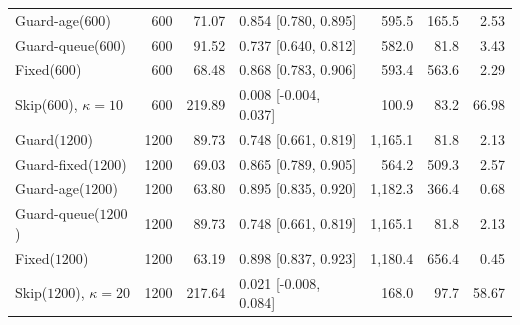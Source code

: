 \documentclass[mathematics,supfile,submit,moreauthors]{Definitions/mdpi}
\newcommand{\devnum}[1]{#1}
\begin{document}
\begin{table}[H]
\begin{tabular}{lrrlrrr}
Guard-age($\devnum{600}$)    & \devnum{600} & \devnum{71.07} & \devnum{0.854 [0.780, 0.895]} & \devnum{595.5} & \devnum{165.5} & \devnum{2.53} \\
Guard-queue($\devnum{600}$)  & \devnum{600} & \devnum{91.52} & \devnum{0.737 [0.640, 0.812]} & \devnum{582.0} & \devnum{81.8} & \devnum{3.43} \\
Fixed($\devnum{600}$)        & \devnum{600} & \devnum{68.48} & \devnum{0.868 [0.783, 0.906]} & \devnum{593.4} & \devnum{563.6} & \devnum{2.29} \\
Skip($\devnum{600}$), $\kappa=10$ & \devnum{600} & \devnum{219.89} & \devnum{0.008 [-0.004, 0.037]} & \devnum{100.9} & \devnum{83.2} & \devnum{66.98} \\
Guard($\devnum{1200}$)       & \devnum{1200} & \devnum{89.73} & \devnum{0.748 [0.661, 0.819]} & \devnum{1{,}165.1} & \devnum{81.8} & \devnum{2.13} \\
Guard-fixed($\devnum{1200}$) & \devnum{1200} & \devnum{69.03} & \devnum{0.865 [0.789, 0.905]} & \devnum{564.2} & \devnum{509.3} & \devnum{2.57} \\
Guard-age($\devnum{1200}$)   & \devnum{1200} & \devnum{63.80} & \devnum{0.895 [0.835, 0.920]} & \devnum{1{,}182.3} & \devnum{366.4} & \devnum{0.68} \\
Guard-queue($\devnum{1200}$) & \devnum{1200} & \devnum{89.73} & \devnum{0.748 [0.661, 0.819]} & \devnum{1{,}165.1} & \devnum{81.8} & \devnum{2.13} \\
Fixed($\devnum{1200}$)       & \devnum{1200} & \devnum{63.19} & \devnum{0.898 [0.837, 0.923]} & \devnum{1{,}180.4} & \devnum{656.4} & \devnum{0.45} \\
Skip($\devnum{1200}$), $\kappa=20$ & \devnum{1200} & \devnum{217.64} & \devnum{0.021 [-0.008, 0.084]} & \devnum{168.0} & \devnum{97.7} & \devnum{58.67} \\
\bottomrule
\end{tabular}
\end{table}
\end{document}
